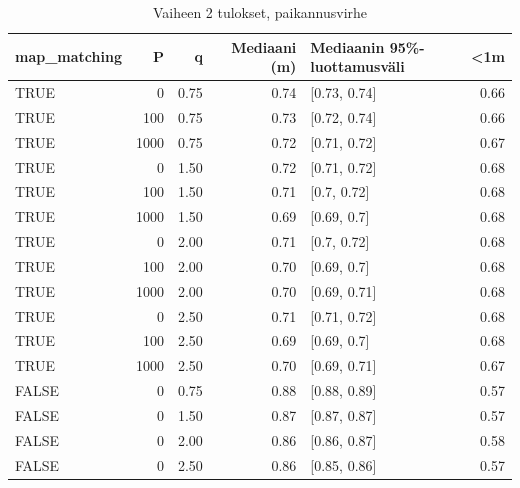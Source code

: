 \documentclass[
  12pt,
  a4paper, twoside]{book}
\begin{document}
\begin{table}

\caption{\label{tab:vaihe-2-tulokset}Vaiheen 2 tulokset, paikannusvirhe}
\centering
\begin{tabular}[t]{lrrrlr}
\toprule
map\_matching & P & q & Mediaani (m) & Mediaanin 95\%-luottamusväli & <1m\\
\midrule
TRUE & 0 & 0.75 & 0.74 & {}[0.73, 0.74] & 0.66\\
TRUE & 100 & 0.75 & 0.73 & {}[0.72, 0.74] & 0.66\\
TRUE & 1000 & 0.75 & 0.72 & {}[0.71, 0.72] & 0.67\\
TRUE & 0 & 1.50 & 0.72 & {}[0.71, 0.72] & 0.68\\
TRUE & 100 & 1.50 & 0.71 & {}[0.7, 0.72] & 0.68\\
\addlinespace
TRUE & 1000 & 1.50 & 0.69 & {}[0.69, 0.7] & 0.68\\
TRUE & 0 & 2.00 & 0.71 & {}[0.7, 0.72] & 0.68\\
TRUE & 100 & 2.00 & 0.70 & {}[0.69, 0.7] & 0.68\\
TRUE & 1000 & 2.00 & 0.70 & {}[0.69, 0.71] & 0.68\\
TRUE & 0 & 2.50 & 0.71 & {}[0.71, 0.72] & 0.68\\
\addlinespace
TRUE & 100 & 2.50 & 0.69 & {}[0.69, 0.7] & 0.68\\
TRUE & 1000 & 2.50 & 0.70 & {}[0.69, 0.71] & 0.67\\
FALSE & 0 & 0.75 & 0.88 & {}[0.88, 0.89] & 0.57\\
FALSE & 0 & 1.50 & 0.87 & {}[0.87, 0.87] & 0.57\\
FALSE & 0 & 2.00 & 0.86 & {}[0.86, 0.87] & 0.58\\
\addlinespace
FALSE & 0 & 2.50 & 0.86 & {}[0.85, 0.86] & 0.57\\
\bottomrule
\end{tabular}
\end{table}
\end{document}
